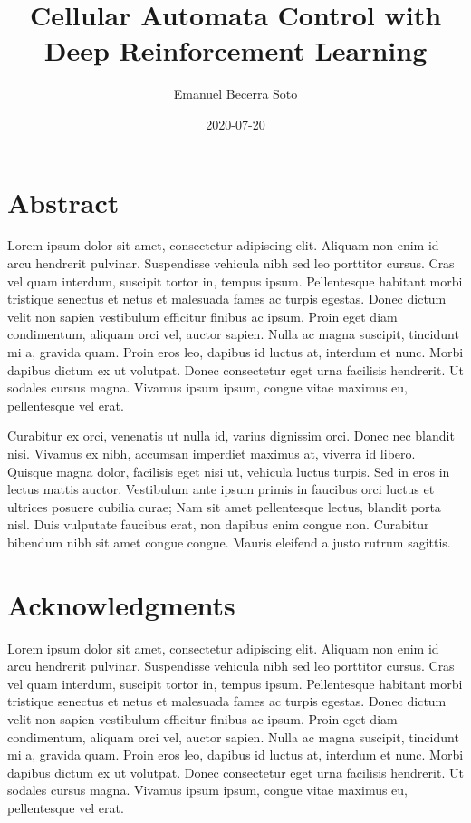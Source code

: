 \documentclass[
  openany]{book}
\title{Cellular Automata Control with Deep Reinforcement Learning}
\author{Emanuel Becerra Soto}
\date{2020-07-20}
\begin{document}
\maketitle

{
\setcounter{tocdepth}{3}
\tableofcontents
}
\listoftables
\listoffigures
\hypertarget{abstract}{%
\chapter*{Abstract}\label{abstract}}

Lorem ipsum dolor sit amet, consectetur adipiscing elit. Aliquam non enim id arcu hendrerit pulvinar. Suspendisse vehicula nibh sed leo porttitor cursus. Cras vel quam interdum, suscipit tortor in, tempus ipsum. Pellentesque habitant morbi tristique senectus et netus et malesuada fames ac turpis egestas. Donec dictum velit non sapien vestibulum efficitur finibus ac ipsum. Proin eget diam condimentum, aliquam orci vel, auctor sapien. Nulla ac magna suscipit, tincidunt mi a, gravida quam. Proin eros leo, dapibus id luctus at, interdum et nunc. Morbi dapibus dictum ex ut volutpat. Donec consectetur eget urna facilisis hendrerit. Ut sodales cursus magna. Vivamus ipsum ipsum, congue vitae maximus eu, pellentesque vel erat.

Curabitur ex orci, venenatis ut nulla id, varius dignissim orci. Donec nec blandit nisi. Vivamus ex nibh, accumsan imperdiet maximus at, viverra id libero. Quisque magna dolor, facilisis eget nisi ut, vehicula luctus turpis. Sed in eros in lectus mattis auctor. Vestibulum ante ipsum primis in faucibus orci luctus et ultrices posuere cubilia curae; Nam sit amet pellentesque lectus, blandit porta nisl. Duis vulputate faucibus erat, non dapibus enim congue non. Curabitur bibendum nibh sit amet congue congue. Mauris eleifend a justo rutrum sagittis.

\newpage

\hypertarget{acknowledgments}{%
\chapter*{Acknowledgments}\label{acknowledgments}}

Lorem ipsum dolor sit amet, consectetur adipiscing elit. Aliquam non enim id arcu hendrerit pulvinar. Suspendisse vehicula nibh sed leo porttitor cursus. Cras vel quam interdum, suscipit tortor in, tempus ipsum. Pellentesque habitant morbi tristique senectus et netus et malesuada fames ac turpis egestas. Donec dictum velit non sapien vestibulum efficitur finibus ac ipsum. Proin eget diam condimentum, aliquam orci vel, auctor sapien. Nulla ac magna suscipit, tincidunt mi a, gravida quam. Proin eros leo, dapibus id luctus at, interdum et nunc. Morbi dapibus dictum ex ut volutpat. Donec consectetur eget urna facilisis hendrerit. Ut sodales cursus magna. Vivamus ipsum ipsum, congue vitae maximus eu, pellentesque vel erat.
\end{document}
